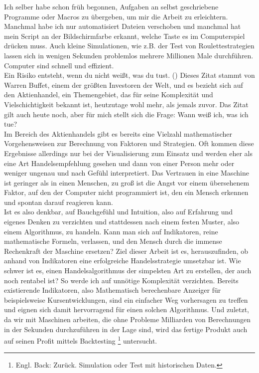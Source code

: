 \documentclass[12pt]{article}
\begin{document}
	Ich selber habe schon früh begonnen, Aufgaben an selbst geschriebene Programme oder Macros zu übergeben, um mir die Arbeit zu erleichtern. Manchmal habe ich nur automatisiert Dateien verschoben und manchmal hat mein Script an der Bildschirmfarbe erkannt, welche Taste es im Computerspiel drücken muss. Auch kleine Simulationen, wie z.B. der Test von Roulettestrategien lassen sich in wenigen Sekunden problemlos mehrere Millionen Male durchführen. Computer sind schnell und effizient.\\
	\glqq Ein Risiko entsteht, wenn du nicht weißt, was du tust. \grqq{}  (\cite{ChristophRottwilm}) Dieses Zitat stammt von Warren Buffet, einem der größten Investoren der Welt, und es bezieht sich auf den Aktienhandel, ein Themengebiet, das für seine Komplexität und Vielschichtigkeit bekannt ist, heutzutage wohl mehr, als jemals zuvor. Das Zitat gilt auch heute noch, aber für mich stellt sich die Frage: Wann weiß ich, was ich tue?\\
	Im Bereich des Aktienhandels gibt es bereits eine Vielzahl mathematischer Vorgehensweisen zur Berechnung von Faktoren und Strategien. Oft kommen diese Ergebnisse allerdings nur bei der Visualisierung zum Einsatz und werden eher als eine Art Handelsempfehlung gesehen und dann von einer Person mehr oder weniger ungenau und nach Gefühl interpretiert. Das Vertrauen in eine Maschine ist geringer als in einen Menschen, zu groß ist die Angst vor einem übersehenem Faktor, auf den der Computer nicht programmiert ist, den ein Mensch erkennen und spontan darauf reagieren kann.\\
	Ist es also denkbar, auf Bauchgefühl und Intuition, also auf Erfahrung und eigenes Denken zu verzichten und stattdessen nach einem festen Muster, also einem Algorithmus, zu handeln. Kann man sich auf Indikatoren, reine mathematische Formeln, verlassen, und den Mensch durch die immense Rechenkraft der Maschine ersetzen? Ziel dieser Arbeit ist es, herauszufinden, ob anhand von Indikatoren eine erfolgreiche Handelsstrategie umsetzbar ist. Wie schwer ist es, einen Handelsalgorithmus der simpelsten Art zu erstellen, der auch noch rentabel ist? So werde ich auf unnötige Komplexität verzichten. Bereits existierende Indikatoren, also Mathematisch berechenbare Anzeiger für beispielsweise Kursentwicklungen, sind ein einfacher Weg vorhersagen zu treffen und eignen sich damit hervorragend für einen solchen Algorithmus. Und zuletzt, da wir mit Maschinen arbeiten, die ohne Probleme Milliarden von Berechnungen in der Sekunden durchzuführen in der Lage sind, wird das fertige Produkt auch auf seinen Profit mittels Backtesting \footnote{Engl. Back: Zurück. Simulation oder Test mit historischen Daten.} untersucht.
\end{document}
